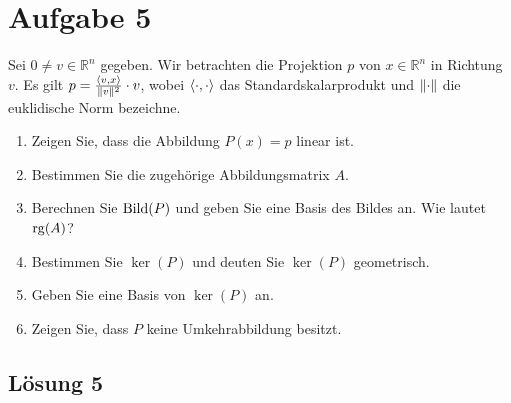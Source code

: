 \documentclass[main.tex]{subfiles}
\begin{document}
\section{Aufgabe 5}
Sei $0 \neq v \in \mathbb{R}^n$ gegeben. Wir betrachten die Projektion $p$ von $x\in \mathbb{R}^n$ in Richtung $v$. Es gilt $p=\frac{\langle v,x\rangle}{\lVert v\rVert^2} \cdot v$, wobei $\langle\cdot, \cdot\rangle$ das Standardskalarprodukt und $\lVert\cdot\rVert$ die euklidische Norm bezeichne.

\begin{enumerate}
    \item Zeigen Sie, dass die Abbildung $P(x)=p$ linear ist.
    \item Bestimmen Sie die zugehörige Abbildungsmatrix $A$.
    \item Berechnen Sie $\operatorname{Bild}(P)$ und geben Sie eine Basis des Bildes an. Wie lautet $\operatorname{rg}(A)$?
    \item Bestimmen Sie $\ker(P)$ und deuten Sie $\ker(P)$ geometrisch.
    \item Geben Sie eine Basis von $\ker(P)$ an.
    \item Zeigen Sie, dass $P$ keine Umkehrabbildung besitzt.
\end{enumerate}

\subsection{Lösung 5}
\end{document}
